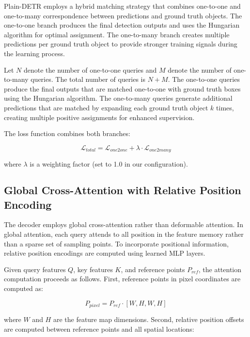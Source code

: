 \documentclass[12pt,a4paper]{article}
\begin{document}
Plain-DETR employs a hybrid matching strategy that combines one-to-one and one-to-many correspondence between predictions and ground truth objects. The one-to-one branch produces the final detection outputs and uses the Hungarian algorithm for optimal assignment. The one-to-many branch creates multiple predictions per ground truth object to provide stronger training signals during the learning process.

Let $N$ denote the number of one-to-one queries and $M$ denote the number of one-to-many queries. The total number of queries is $N + M$. The one-to-one queries produce the final outputs that are matched one-to-one with ground truth boxes using the Hungarian algorithm. The one-to-many queries generate additional predictions that are matched by expanding each ground truth object $k$ times, creating multiple positive assignments for enhanced supervision.

The loss function combines both branches:

\begin{equation}
\mathcal{L}_{total} = \mathcal{L}_{one2one} + \lambda \cdot \mathcal{L}_{one2many}
\end{equation}

where $\lambda$ is a weighting factor (set to 1.0 in our configuration).

\subsection{Global Cross-Attention with Relative Position Encoding}

The decoder employs global cross-attention rather than deformable attention. In global attention, each query attends to all position in the feature memory rather than a sparse set of sampling points. To incorporate positional information, relative position encodings are computed using learned MLP layers.

Given query features $Q$, key features $K$, and reference points $P_{ref}$, the attention computation proceeds as follows. First, reference points in pixel coordinates are computed as:

\begin{equation}
P_{pixel} = P_{ref} \cdot [W, H, W, H]
\end{equation}

where $W$ and $H$ are the feature map dimensions. Second, relative position offsets are computed between reference points and all spatial locations:
\end{document}

